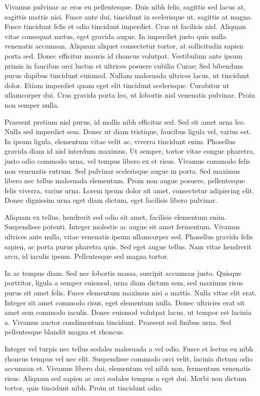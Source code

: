 \documentclass[10pt, a4paper, twocolumn, utf8]{article}
\begin{document}
Vivamus pulvinar ac eros eu pellentesque. Duis nibh felis, sagittis sed lacus at, sagittis mattis nisi. Fusce ante dui, tincidunt in scelerisque ut, sagittis at magna. Fusce tincidunt felis et odio tincidunt imperdiet. Cras ut facilisis nisl. Aliquam vitae consequat metus, eget gravida augue. In imperdiet justo quis nulla venenatis accumsan. Aliquam aliquet consectetur tortor, at sollicitudin sapien porta sed. Donec efficitur mauris id rhoncus volutpat. Vestibulum ante ipsum primis in faucibus orci luctus et ultrices posuere cubilia Curae; Sed bibendum purus dapibus tincidunt euismod. Nullam malesuada ultrices lacus, ut tincidunt dolor. Etiam imperdiet quam eget elit tincidunt scelerisque. Curabitur ut ullamcorper dui. Cras gravida porta leo, ut lobortis nisl venenatis pulvinar. Proin non semper nulla.

Praesent pretium nisl purus, id mollis nibh efficitur sed. Sed sit amet urna leo. Nulla sed imperdiet sem. Donec ut diam tristique, faucibus ligula vel, varius est. In ipsum ligula, elementum vitae velit ac, viverra tincidunt enim. Phasellus gravida diam id nisl interdum maximus. Ut semper, tortor vitae congue pharetra, justo odio commodo urna, vel tempus libero ex et risus. Vivamus commodo felis non venenatis rutrum. Sed pulvinar scelerisque augue in porta. Sed maximus libero nec tellus malesuada elementum. Proin non augue posuere, pellentesque felis viverra, varius urna. Lorem ipsum dolor sit amet, consectetur adipiscing elit. Donec dignissim urna eget diam dictum, eget facilisis libero pulvinar.

Aliquam ex tellus, hendrerit sed odio sit amet, facilisis elementum enim. Suspendisse potenti. Integer molestie ac augue sit amet fermentum. Vivamus ultrices ante nulla, vitae venenatis ipsum ullamcorper sed. Phasellus gravida felis sapien, ac porta purus pharetra quis. Sed eget augue tellus. Nam vitae hendrerit arcu, id iaculis ipsum. Pellentesque sed magna tortor.

In ac tempus diam. Sed nec lobortis massa, suscipit accumsan justo. Quisque porttitor, ligula a semper euismod, urna diam dictum sem, sed maximus risus purus sit amet felis. Fusce elementum maximus nisi a mattis. Nulla vitae elit erat. Integer sit amet commodo risus, eget elementum nulla. Donec ultricies erat sit amet sem commodo iaculis. Donec euismod volutpat lacus, ut tempor est lacinia a. Vivamus auctor condimentum tincidunt. Praesent sed finibus urna. Sed pellentesque blandit magna et rhoncus.

Integer vel turpis nec tellus sodales malesuada a vel odio. Fusce et lectus eu nibh rhoncus tempus vel nec elit. Suspendisse commodo orci velit, lacinia dictum odio accumsan et. Vivamus libero dui, elementum vel nibh non, fermentum venenatis risus. Aliquam sed sapien ac orci sodales tempus a eget dui. Morbi non dictum tortor, quis tincidunt nibh. Proin ut tincidunt odio.
\end{document}
